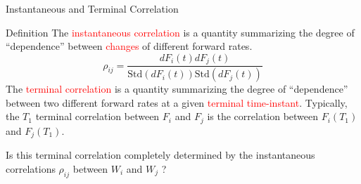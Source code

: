 \documentclass{beamer}
\begin{document}
\begin{frame}{Instantaneous and Terminal Correlation}
	
	\begin{block}{Definition}
		The \textcolor{red}{instantaneous correlation} is a quantity summarizing the degree of “dependence” between \textcolor{red}{changes} of different forward rates.
		\begin{equation*}
			\rho_{ij} = \frac{dF_i(t) dF_j(t)}{\text{Std}(dF_i(t))\text{Std}(dF_j(t))}
		\end{equation*}
		The \textcolor{red}{terminal correlation} is a quantity summarizing the degree of “dependence” between two different forward rates at a given  \textcolor{red}{terminal time-instant}. Typically, the $T_1$ terminal correlation between $F_i$ and $F_j$ is the correlation between $F_i(T_1)$ and $F_j(T_1)$.
	\end{block}
	Is this terminal correlation completely determined by the instantaneous correlations $\rho_{ij}$ between $W_i$ and $W_j$ ?
\end{frame}
\end{document}
